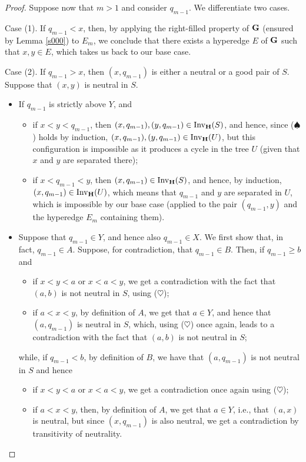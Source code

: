 \documentclass[10pt,a4paper]{amsart}
\newcommand{\Inv}{{\mathrm{Inv}}}
\begin{document}
\begin{proof}
\smallskip

Suppose now that $m>1$ and consider $q_{m-1}$. We differentiate two cases.
 
\smallskip
\indent Case (1). If $q_{m-1}<x$, then, by applying the right-filled property of ${\bf G}$ (ensured by Lemma \ref{s000}) to $E_{m}$, we conclude that there exists a hyperedge $E$ of ${\bf G}$ such that $x,y\in E$, which takes us back to our base case.


 
\smallskip

 
\indent Case (2). If $q_{m-1}>x$, then $(x,q_{m-1})$ is either a neutral or a good pair of $S$. Suppose that $(x,y)$ is neutral in $S$.
\begin{itemize}
\item If $q_{m-1}$ is strictly above $Y$, and
\begin{itemize}
\item if $x<y<q_{m-1}$, then $(x,q_{m-1}),(y,q_{m-1})\in \Inv_{\bf H}(S)$, and hence, since ($\spadesuit$) holds by induction, $(x,q_{m-1}),(y,q_{m-1})\in \Inv_{\bf H}(U)$, but this configuration is impossible as it produces a cycle in the tree $U$ (given that $x$ and $y$ are separated there);
\item if $x<q_{m-1}<y$, then $(x,q_{m-1})\in \Inv_{\bf H}(S)$, and hence, by induction, $(x,q_{m-1})\in \Inv_{\bf H}(U)$, which means that $q_{m-1}$ and $y$ are separated in $U$, which is impossible by our base case (applied to the pair $(q_{m-1},y)$ and the hyperedge $E_m$ containing them).
\end{itemize}


\item Suppose that $q_{m-1}\in Y$, and hence also $q_{m-1}\in X$. We first show that, in fact, $q_{m-1}\in A$. Suppose, for contradiction, that $q_{m-1}\in B$. Then, if $q_{m-1}\geq b$ and
\begin{itemize}
\item if $x<y<a$ or $x<a<y$, we get a contradiction with the fact that $(a,b)$ is not neutral in $S$, using ($\heartsuit$);
\item if $a<x<y$, by definition of $A$, we get that $a\in Y$, and hence that $(a,q_{m-1})$ is neutral in $S$, which, using ($\heartsuit$) once again, leads to a contradiction with the fact that $(a,b)$ is not neutral in $S$;
\end{itemize}
while, if $q_{m-1}< b$, by definition of $B$, we have that $(a,q_{m-1})$ is not neutral in $S$ and hence
\begin{itemize}
\item if $x<y<a$ or $x<a<y$, we get a contradiction once again using ($\heartsuit$);
\item if $a<x<y$, then, by definition of $A$, we get that $a\in Y$, i.e., that $(a,x)$ is neutral, but since $(x,q_{m-1})$ is also neutral, we get a contradiction by transitivity of neutrality. 
\end{itemize}


\end{itemize}
\end{proof}
\end{document}

